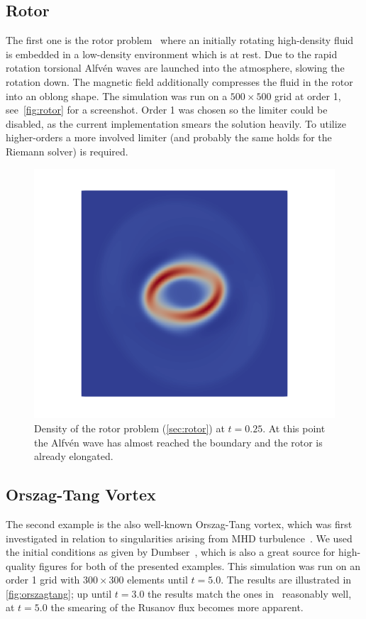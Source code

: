 \documentclass[a4paper]{article}
\begin{document}
\subsection{Rotor}\label{sec:rotor}
The first one is the rotor problem~\cite{balsara1999staggered} where an
initially rotating high-density fluid is embedded in a low-density environment
which is at rest. Due to the rapid rotation torsional Alfv\'en waves are launched
into the atmosphere, slowing the rotation down. The magnetic field additionally
compresses the fluid in the rotor into an oblong shape. The simulation was run
on a $500 \times 500$ grid at order 1, see~\autoref{fig:rotor} for a screenshot.
Order 1 was chosen so the limiter could be disabled, as the current
implementation smears the solution heavily. To utilize higher-orders a more
involved limiter (and probably the same holds for the Riemann solver) is required.

\begin{figure}[h]
  \centering
  \includegraphics[width=\textwidth]{results/rotor}
  \caption{Density of the rotor problem (\autoref{sec:rotor}) at $t=0.25$. At this point the Alfv\'en
    wave has almost reached the boundary and the rotor is already elongated.}
  \label{fig:rotor}
\end{figure}

\subsection{Orszag-Tang Vortex}\label{sec:orszagtang}
The second example is the also well-known Orszag-Tang vortex, which was first
investigated in relation to singularities arising from MHD
turbulence~\cite{orszag1979small}. We used the initial conditions as given by
Dumbser~\cite{dumbser2019divergence}, which is also a great source for
high-quality figures for both of the presented examples. This simulation was run
on an order 1 grid with $300 \times 300$ elements until $t=5.0$. The results are illustrated
in \autoref{fig:orszagtang}; up until $t=3.0$ the results match the ones
in~\cite{dumbser2019divergence} reasonably well, at $t=5.0$ the smearing of
the Rusanov flux becomes more apparent.
\end{document}
